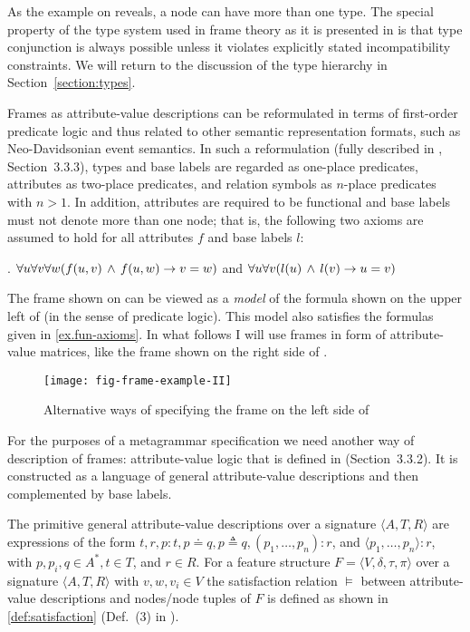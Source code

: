 As the example on  reveals, a node can have more than one type. The special property of the type system used in frame theory as it is presented in \citealt{KallmeyerOsswald:13} is that type conjunction is always possible unless it violates explicitly stated incompatibility constraints. We will return to the discussion of the type hierarchy in Section~\ref{section:types}.

Frames as attribute-value descriptions can be reformulated in terms of first-order predicate logic and thus related to other semantic representation formats, such as Neo-Davidsonian event semantics. In such a reformulation (fully described in \citealt{KallmeyerOsswald:13}, Section~3.3.3), types and base
labels are regarded as one-place predicates, attributes as two-place predicates, and relation symbols as $n$-place predicates with $n>1$.
In addition, attributes are required to be functional and base labels must
not denote more than one node;
that is, the following two axioms are assumed to hold for all
attributes $f$ and base labels $l$:

\ex.\label{ex.fun-axioms}
$\forall u\forall v\forall w(f(u,v)\,\wedge\, f(u,w)\rightarrow v=w)$
\qquad and \qquad
$\forall u\forall v(l(u)\,\wedge\, l(v)\rightarrow u=v)$

The frame shown on  can be viewed
as a \emph{model} of the formula shown on the upper left of  (in the sense of predicate logic). This model also satisfies the formulas given in \ref{ex.fun-axioms}. In what follows I will use frames in form of attribute-value matrices, like the frame shown on the right side of .
%
\begin{figure}
\hfill
\texttt{[image: fig-frame-example-II]}
\hfill
\caption{Alternative ways of specifying the frame on the left side of
}
\label{fig-frame-example-II}
\end{figure}%
%

For the purposes of a metagrammar specification we need another way of description of frames: attribute-value logic that is defined in \citealt{KallmeyerOsswald:13} (Section~3.3.2). It is constructed as a language of general attribute-value descriptions and then complemented by base labels.

The primitive general attribute-value descriptions over a signature $\langle A, T, R \rangle$ are expressions of the form $t, r, p : t, p \doteq q, p \triangleq q, (p_1, \ldots , p_n) : r$, and $\langle p_1, \ldots , p_n \rangle : r$,
with $p, p_i, q \in A^*, t \in T$, and $r \in R$. For a feature structure $F = \langle V, \delta, \tau, \pi \rangle$ over a signature $\langle A, T, R \rangle$ with $v,w, v_i \in V$ the satisfaction relation $\models$ between attribute-value descriptions and nodes/node tuples of $F$ is defined as shown in \ref{def:satisfaction} (Def.~(3) in \citealt{KallmeyerOsswald:13}).

